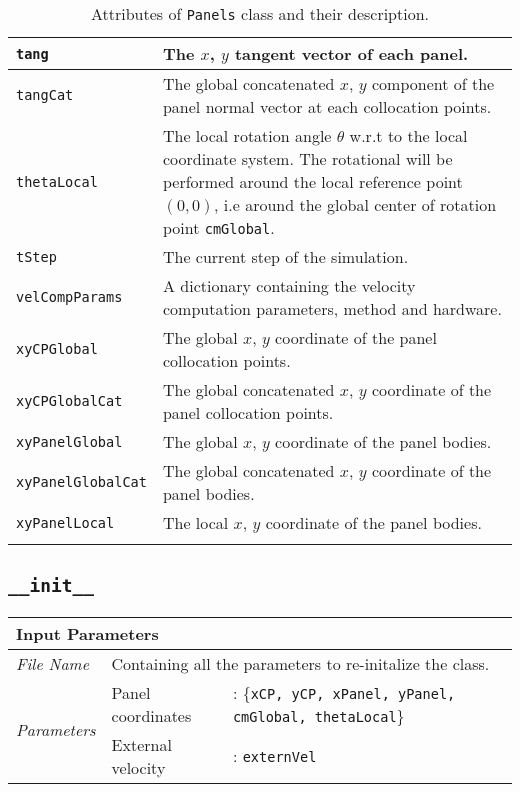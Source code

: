 \begin{longtable}{|l|p{11cm}|}
	\texttt{tang} & The $x$, $y$ tangent vector of each panel.\\          \hline
	\texttt{tangCat} & The global concatenated $x$, $y$ component of the panel
	                  normal vector at each collocation points.\\          \hline
	\texttt{thetaLocal} & The local rotation angle $\theta$ w.r.t to the local
	                     coordinate system. The rotational will be performed around
	                     the local reference point $(0,0)$, i.e around the global center of rotation point \texttt{cmGlobal}.\\          \hline
	\texttt{tStep} & The current step of the simulation.\\          \hline
	\texttt{velCompParams} & A dictionary containing the velocity computation parameters, method and hardware.\\          \hline
	\texttt{xyCPGlobal} & The global $x$, $y$ coordinate of the panel collocation
	                     points.\\ \hline
	\texttt{xyCPGlobalCat} & The global concatenated $x$, $y$ coordinate of the
	                        panel collocation points.\\          \hline
	\texttt{xyPanelGlobal} & The global $x$, $y$ coordinate of the panel bodies.\\          \hline
	\texttt{xyPanelGlobalCat} & The global concatenated $x$, $y$ coordinate of the
	                           panel bodies.\\          \hline
	\texttt{xyPanelLocal} & The local $x$, $y$ coordinate of the panel bodies.\\          \hline
                       
    \caption{Attributes of \texttt{Panels} class and their description.}
    \label{tab:attributesPanels}
\end{longtable}
\endgroup


\subsection*{\texttt{\_\_init\_\_}}
	\begin{tabular}{l|lp{7cm}}
		\multicolumn{2}{l}{\textbf{Input Parameters}} & \\ \hline
		\textit{File Name} & \multicolumn{2}{l}{Containing all the parameters to re-initalize the class.} \\ \hline
		\multirow{2}{*}{\textit{Parameters}} & Panel coordinates &: \{\texttt{xCP, yCP, xPanel, yPanel, cmGlobal, thetaLocal}\}\\ \cline{2-3}
		& External velocity &: \texttt{externVel} \\ \cline{2-3}
	\end{tabular}
